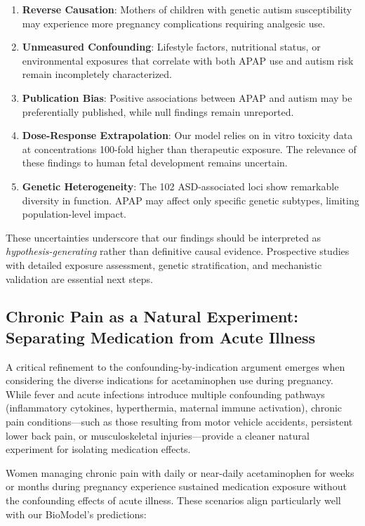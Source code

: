 \documentclass[11pt]{article}
\let\oldsubsection\subsection
\renewcommand{\subsection}[1]{\oldsubsection{#1}\setlength{\leftskip}{0.75em}}
\begin{document}
\begin{enumerate}
\item \textbf{Reverse Causation}: Mothers of children with genetic autism susceptibility may experience more pregnancy complications requiring analgesic use.

\item \textbf{Unmeasured Confounding}: Lifestyle factors, nutritional status, or environmental exposures that correlate with both APAP use and autism risk remain incompletely characterized.

\item \textbf{Publication Bias}: Positive associations between APAP and autism may be preferentially published, while null findings remain unreported.

\item \textbf{Dose-Response Extrapolation}: Our model relies on in vitro toxicity data at concentrations 100-fold higher than therapeutic exposure. The relevance of these findings to human fetal development remains uncertain.

\item \textbf{Genetic Heterogeneity}: The 102 ASD-associated loci show remarkable diversity in function. APAP may affect only specific genetic subtypes, limiting population-level impact.
\end{enumerate}

These uncertainties underscore that our findings should be interpreted as \textit{hypothesis-generating} rather than definitive causal evidence. Prospective studies with detailed exposure assessment, genetic stratification, and mechanistic validation are essential next steps.

\subsection{Chronic Pain as a Natural Experiment: Separating Medication from Acute Illness}

A critical refinement to the confounding-by-indication argument emerges when considering the diverse indications for acetaminophen use during pregnancy. While fever and acute infections introduce multiple confounding pathways (inflammatory cytokines, hyperthermia, maternal immune activation), chronic pain conditions---such as those resulting from motor vehicle accidents, persistent lower back pain, or musculoskeletal injuries---provide a cleaner natural experiment for isolating medication effects.

Women managing chronic pain with daily or near-daily acetaminophen for weeks or months during pregnancy experience sustained medication exposure without the confounding effects of acute illness. These scenarios align particularly well with our BioModel's predictions:
\end{document}

